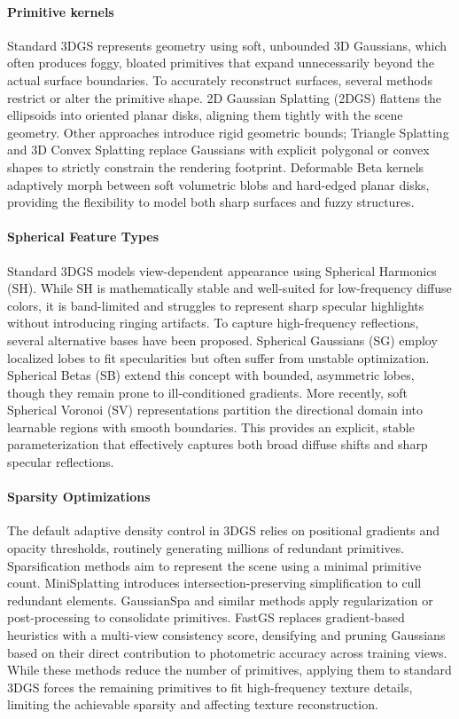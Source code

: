 \documentclass[acmtog,anonymous,review]{acmart}
\begin{document}
\paragraph{\textbf{Primitive kernels}} 
Standard 3DGS represents geometry using soft, unbounded 3D Gaussians, which often produces foggy, bloated primitives that expand unnecessarily beyond the actual surface boundaries. To accurately reconstruct surfaces, several methods restrict or alter the primitive shape. 2D Gaussian Splatting (2DGS) flattens the ellipsoids into oriented planar disks, aligning them tightly with the scene geometry. Other approaches introduce rigid geometric bounds; Triangle Splatting and 3D Convex Splatting replace Gaussians with explicit polygonal or convex shapes to strictly constrain the rendering footprint. Deformable Beta kernels adaptively morph between soft volumetric blobs and hard-edged planar disks, providing the flexibility to model both sharp surfaces and fuzzy structures.

\paragraph{\textbf{Spherical Feature Types}}
Standard 3DGS models view-dependent appearance using Spherical Harmonics (SH). While SH is mathematically stable and well-suited for low-frequency diffuse colors, it is band-limited and struggles to represent sharp specular highlights without introducing ringing artifacts. To capture high-frequency reflections, several alternative bases have been proposed. Spherical Gaussians (SG) employ localized lobes to fit specularities but often suffer from unstable optimization. Spherical Betas (SB) extend this concept with bounded, asymmetric lobes, though they remain prone to ill-conditioned gradients. More recently, soft Spherical Voronoi (SV) representations partition the directional domain into learnable regions with smooth boundaries. This provides an explicit, stable parameterization that effectively captures both broad diffuse shifts and sharp specular reflections.

\paragraph{\textbf{Sparsity Optimizations}} The default adaptive density control in 3DGS relies on positional gradients and opacity thresholds, routinely generating millions of redundant primitives. Sparsification methods aim to represent the scene using a minimal primitive count. MiniSplatting introduces intersection-preserving simplification to cull redundant elements. GaussianSpa and similar methods apply regularization or post-processing to consolidate primitives. FastGS replaces gradient-based heuristics with a multi-view consistency score, densifying and pruning Gaussians based on their direct contribution to photometric accuracy across training views. While these methods reduce the number of primitives, applying them to standard 3DGS forces the remaining primitives to fit high-frequency texture details, limiting the achievable sparsity and affecting texture reconstruction.
\end{document}
